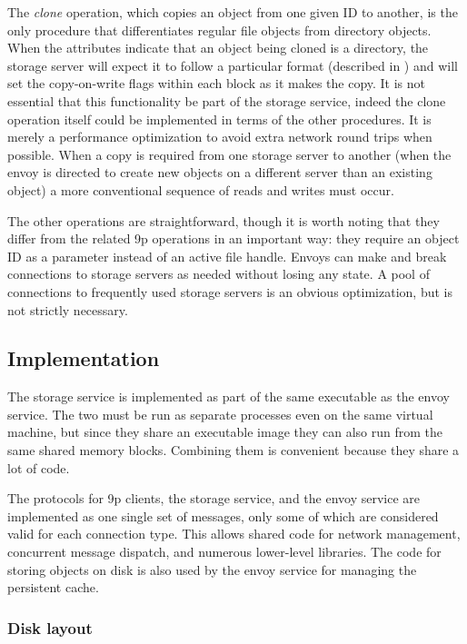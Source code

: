 The \emph{clone} operation, which copies an object from one given ID to another, is the only procedure that differentiates regular file objects from directory objects. When the attributes indicate that an object being cloned is a directory, the storage server will expect it to follow a particular format (described in ) and will set the copy-on-write flags within each block as it makes the copy. It is not essential that this functionality be part of the storage service, indeed the clone operation itself could be implemented in terms of the other procedures. It is merely a performance optimization to avoid extra network round trips when possible. When a copy is required from one storage server to another (when the envoy is directed to create new objects on a different server than an existing object) a more conventional sequence of reads and writes must occur.

The other operations are straightforward, though it is worth noting that they differ from the related 9p operations in an important way: they require an object ID as a parameter instead of an active file handle. Envoys can make and break connections to storage servers as needed without losing any state. A pool of connections to frequently used storage servers is an obvious optimization, but is not strictly necessary.

\subsection{Implementation}

The storage service is implemented as part of the same executable as the envoy service. The two must be run as separate processes even on the same virtual machine, but since they share an executable image they can also run from the same shared memory blocks. Combining them is convenient because they share a lot of code.

The protocols for 9p clients, the storage service, and the envoy service are implemented as one single set of messages, only some of which are considered valid for each connection type. This allows shared code for network management, concurrent message dispatch, and numerous lower-level libraries. The code for storing objects on disk is also used by the envoy service for managing the persistent cache.

\subsubsection{Disk layout}

